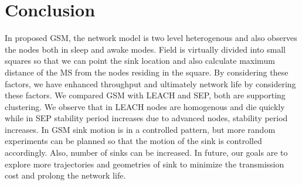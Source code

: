 \documentclass[conference]{IEEEtran}
\begin{document}
\section{Conclusion}
In proposed GSM, the network model is two level heterogenous and also observes the nodes both in sleep and awake modes. Field is virtually divided into small squares so that we can point the sink location and also calculate maximum distance of the MS from the nodes residing in the square. By considering these factors, we have enhanced throughput and ultimately network life by considering these factors. We compared GSM with LEACH and SEP, both are supporting clustering. We observe that in LEACH nodes are homogenous and die quickly while in SEP stability period increases due to advanced nodes, stability period increases. In GSM sink motion is in a controlled pattern, but more random experiments can be planned so that the motion of the sink is controlled accordingly. Also, number of sinks can be increased.  In future, our goals are to explore more trajectories and geometries of sink to minimize the transmission cost and prolong the network life.
\end{document}

